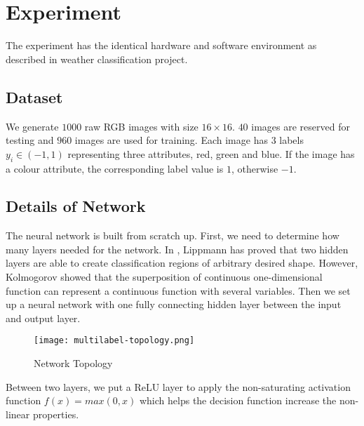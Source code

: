 
\chapter{Experiment} %
\label{Chapter8}

The experiment has the identical hardware and software environment as described in weather classification project.

\section{Dataset}

We generate $1000$ raw RGB images with size $16 \times 16$. $40$ images are reserved for testing and $960$ images are used for training. Each image has $3$ labels $y_i \in (-1, 1)$ representing three attributes, red, green and blue. If the image has a colour attribute, the corresponding label value is $1$, otherwise $-1$.

\section{Details of Network}

The neural network is built from scratch up. First, we need to determine how many layers needed for the network. In \cite{lippmann1987introduction}, Lippmann has proved that two hidden layers are able to create classification regions of arbitrary desired shape. However, Kolmogorov \citep{kolmogorov1963representation} showed that the superposition of continuous one-dimensional function can represent a continuous function with several variables. Then we set up a neural network with one fully connecting hidden layer between the input and output layer.
\begin{figure}[!htb]
\centering
\texttt{[image: multilabel-topology.png]}
\caption{\label{fig:MLtopology}Network Topology}
\end{figure}
Between two layers, we put a ReLU layer to apply the non-saturating activation function $f(x) = max(0,x)$ which helps the decision function increase the non-linear properties.

